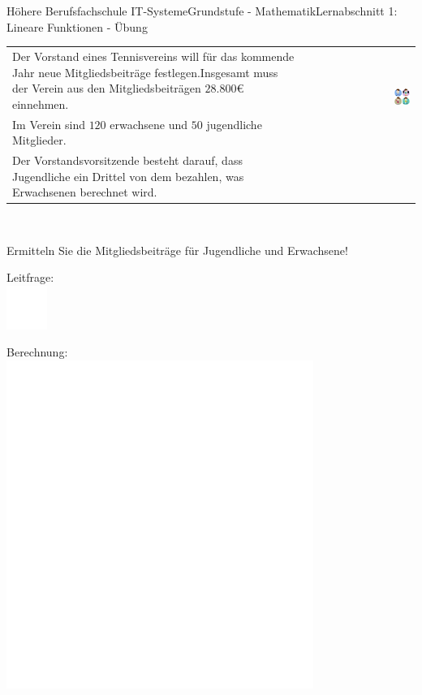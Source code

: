 \documentclass[oneside,openany,headings=optiontotoc,11pt,numbers=noenddot]{scrreprt}
\begin{document}
\begin{worksheet}{Höhere Berufsfachschule IT-Systeme}{Grundstufe - Mathematik}{Lernabschnitt 1: Lineare Funktionen - Übung}
\begin{framed}
		\end{framed}
		\normalsize
		\newpage
		\begin{framed}
			\noindent
			\begin{tabularx}{\textwidth}{Xr}
				Der Vorstand eines Tennisvereins will für das kommende Jahr neue Mitgliedsbeiträge festlegen.Insgesamt muss der Verein aus den Mitgliedsbeiträgen \(28.800\)\euro{} einnehmen. & \multirow{2}{*}{\includegraphics[width=0.15\textwidth,align=b]{../99_Bilder/sporty.jpg}}\\
				Im Verein sind \(120\) erwachsene und \(50\) jugendliche Mitglieder. & \\
				Der Vorstandsvorsitzende besteht darauf, dass Jugendliche ein Drittel von dem bezahlen, was Erwachsenen berechnet wird.\\
			\end{tabularx}\\
			\par\noindent
			Ermitteln Sie die Mitgliedsbeiträge für Jugendliche und Erwachsene!
		\end{framed}
		\begin{framed}
			\noindent
			\small{\color{codegray}Leitfrage:}\\
			\includegraphics[width=0.1\textwidth]{../../empty.jpg}\\
		\end{framed}
		\begin{framed}
			\noindent
			\small{\color{codegray}Berechnung:}\\
			\includegraphics[width=0.75\textwidth]{../../empty.jpg}
		\end{framed}
		\newpage
		

\end{worksheet}
\end{document}

